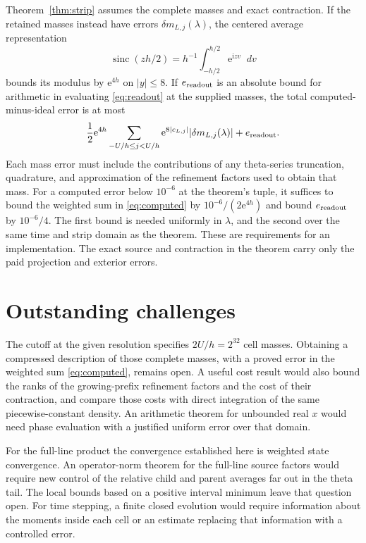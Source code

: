 \documentclass[11pt]{article}
\DeclareMathOperator{\sinc}{sinc}
\newcommand{\dd}{\mathop{}\!d}
\newcommand{\ee}{\mathrm e}
\newcommand{\ii}{\mathrm i}
\begin{document}
Theorem~\ref{thm:strip} assumes the complete masses and exact
contraction. If the retained masses instead have errors
\(\delta m_{L,j}(\lambda)\), the centered average representation
\[
 \sinc(zh/2)=h^{-1}\int_{-h/2}^{h/2}\ee^{\ii zv}\dd v
\]
bounds its modulus by \(\ee^{4h}\) on \(|y|\le8\).
If \(e_{\rm readout}\) is an absolute bound for arithmetic in
evaluating \eqref{eq:readout} at the supplied masses, the total
computed-minus-ideal error is at most
\begin{equation}\label{eq:computed}
 \frac12\ee^{4h}\sum_{-U/h\le j<U/h}
             \ee^{8|c_{L,j}|}|\delta m_{L,j}(\lambda)|
       +e_{\rm readout}.
\end{equation}
Each mass error must include the contributions of any theta-series
truncation, quadrature, and approximation of the refinement factors
used to obtain that mass. For a computed error below \(10^{-6}\)
at the theorem's tuple, it suffices to bound the weighted sum in
\eqref{eq:computed} by \(10^{-6}/(2\ee^{4h})\) and bound
\(e_{\rm readout}\) by \(10^{-6}/4\). The first bound is needed
uniformly in \(\lambda\), and the second over the same time and
strip domain as the theorem. These are requirements for an
implementation. The exact source and contraction in the theorem
carry only the paid projection and exterior errors.

\section{Outstanding challenges}

The cutoff at the given resolution specifies \(2U/h=2^{32}\)
cell masses. Obtaining a compressed description of those complete
masses, with a proved error in the weighted sum
\eqref{eq:computed}, remains open. A useful cost result would
also bound the ranks of the growing-prefix refinement factors
and the cost of their contraction, and compare those costs with
direct integration of the same piecewise-constant density.
An arithmetic theorem for unbounded real \(x\) would need
phase evaluation with a justified uniform error over that domain.

For the full-line product the convergence established here is
weighted state convergence. An operator-norm theorem for the
full-line source factors would require new control of the
relative child and parent averages far out in the theta tail.
The local bounds based on a positive interval minimum leave
that question open. For time stepping, a finite closed evolution
would require information about the moments inside each cell or
an estimate replacing that information with a controlled error.
\end{document}
